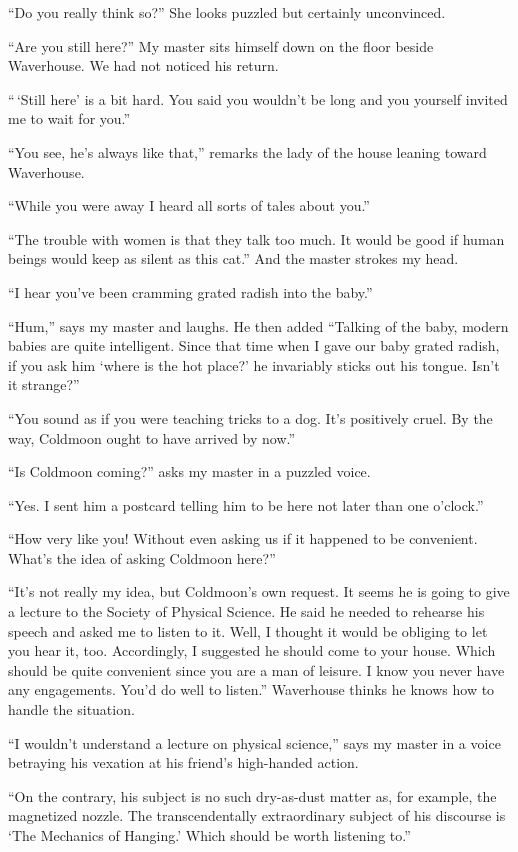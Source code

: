 \documentclass[12pt, openright]{book}
\begin{document}
``Do you really think so?'' She looks puzzled but certainly unconvinced.

``Are you still here?'' My master sits himself down on the floor beside
Waverhouse. We had not noticed his return.

``\,`Still here' is a bit hard. You said you wouldn't be long and you
yourself invited me to wait for you.''

``You see, he's always like that,'' remarks the lady of the house
leaning toward Waverhouse.

``While you were away I heard all sorts of tales about you.''

``The trouble with women is that they talk too much. It would be good if
human beings would keep as silent as this cat.'' And the master strokes
my head.

``I hear you've been cramming grated radish into the baby.''

``Hum,'' says my master and laughs. He then added ``Talking of the baby,
modern babies are quite intelligent. Since that time when I gave our
baby grated radish, if you ask him `where is the hot place?' he
invariably sticks out his tongue. Isn't it strange?''

``You sound as if you were teaching tricks to a dog. It's positively
cruel. By the way, Coldmoon ought to have arrived by now.''

``Is Coldmoon coming?'' asks my master in a puzzled voice.

``Yes. I sent him a postcard telling him to be here not later than one
o'clock.''

``How very like you! Without even asking us if it happened to be
convenient. What's the idea of asking Coldmoon here?''

``It's not really my idea, but Coldmoon's own request. It seems he is
going to give a lecture to the Society of Physical Science. He said he
needed to rehearse his speech and asked me to listen to it. Well, I
thought it would be obliging to let you hear it, too. Accordingly, I
suggested he should come to your house. Which should be quite convenient
since you are a man of leisure. I know you never have any engagements.
You'd do well to listen.'' Waverhouse thinks he knows how to handle the
situation.

``I wouldn't understand a lecture on physical science,'' says my master
in a voice betraying his vexation at his friend's high-handed action.

``On the contrary, his subject is no such dry-as-dust matter as, for
example, the magnetized nozzle. The transcendentally extraordinary
subject of his discourse is `The Mechanics of Hanging.' Which should be
worth listening to.''
\end{document}

